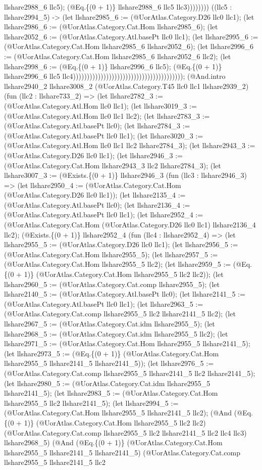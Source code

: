 \documentclass[11pt]{article}
\begin{document}
llshare2988\_6 llc5); (@Eq.\{(0 + 1)\} llshare2988\_6 llc5 llc3)))))))) ((llc5 : llshare2994\_5) -> (let llshare2985\_6 := (@UorAtlas.Category.D26 llc0 llc1); (let llshare2986\_6 := (@UorAtlas.Category.Cat.Hom llshare2985\_6); (let llshare2052\_6 := (@UorAtlas.Category.Atl.basePt llc0 llc1); (let llshare2995\_6 := (@UorAtlas.Category.Cat.Hom llshare2985\_6 llshare2052\_6); (let llshare2996\_6 := (@UorAtlas.Category.Cat.Hom llshare2985\_6 llshare2052\_6 llc2); (let llshare2998\_6 := (@Eq.\{(0 + 1)\} llshare2996\_6 llc5); (@Eq.\{(0 + 1)\} llshare2996\_6 llc5 llc4)))))))))))))))))))))))))))))))))))))))); (@And.intro llshare2940\_2 llshare3008\_2 (@UorAtlas.Category.T45 llc0 llc1 llshare2939\_2) (fun (llc2 : llshare733\_2) => (let llshare2782\_3 := (@UorAtlas.Category.Atl.Hom llc0 llc1); (let llshare3019\_3 := (@UorAtlas.Category.Atl.Hom llc0 llc1 llc2); (let llshare2783\_3 := (@UorAtlas.Category.Atl.basePt llc0); (let llshare2784\_3 := (@UorAtlas.Category.Atl.basePt llc0 llc1); (let llshare3020\_3 := (@UorAtlas.Category.Atl.Hom llc0 llc1 llc2 llshare2784\_3); (let llshare2943\_3 := (@UorAtlas.Category.D26 llc0 llc1); (let llshare2946\_3 := (@UorAtlas.Category.Cat.Hom llshare2943\_3 llc2 llshare2784\_3); (let llshare3007\_3 := (@Exists.\{(0 + 1)\} llshare2946\_3 (fun (llc3 : llshare2946\_3) => (let llshare2950\_4 := (@UorAtlas.Category.Cat.Hom (@UorAtlas.Category.D26 llc0 llc1)); (let llshare2135\_4 := (@UorAtlas.Category.Atl.basePt llc0); (let llshare2136\_4 := (@UorAtlas.Category.Atl.basePt llc0 llc1); (let llshare2952\_4 := (@UorAtlas.Category.Cat.Hom (@UorAtlas.Category.D26 llc0 llc1) llshare2136\_4 llc2); (@Exists.\{(0 + 1)\} llshare2952\_4 (fun (llc4 : llshare2952\_4) => (let llshare2955\_5 := (@UorAtlas.Category.D26 llc0 llc1); (let llshare2956\_5 := (@UorAtlas.Category.Cat.Hom llshare2955\_5); (let llshare2957\_5 := (@UorAtlas.Category.Cat.Hom llshare2955\_5 llc2); (let llshare2959\_5 := (@Eq.\{(0 + 1)\} (@UorAtlas.Category.Cat.Hom llshare2955\_5 llc2 llc2)); (let llshare2960\_5 := (@UorAtlas.Category.Cat.comp llshare2955\_5); (let llshare2140\_5 := (@UorAtlas.Category.Atl.basePt llc0); (let llshare2141\_5 := (@UorAtlas.Category.Atl.basePt llc0 llc1); (let llshare2963\_5 := (@UorAtlas.Category.Cat.comp llshare2955\_5 llc2 llshare2141\_5 llc2); (let llshare2967\_5 := (@UorAtlas.Category.Cat.idm llshare2955\_5); (let llshare2968\_5 := (@UorAtlas.Category.Cat.idm llshare2955\_5 llc2); (let llshare2971\_5 := (@UorAtlas.Category.Cat.Hom llshare2955\_5 llshare2141\_5); (let llshare2973\_5 := (@Eq.\{(0 + 1)\} (@UorAtlas.Category.Cat.Hom llshare2955\_5 llshare2141\_5 llshare2141\_5)); (let llshare2976\_5 := (@UorAtlas.Category.Cat.comp llshare2955\_5 llshare2141\_5 llc2 llshare2141\_5); (let llshare2980\_5 := (@UorAtlas.Category.Cat.idm llshare2955\_5 llshare2141\_5); (let llshare2983\_5 := (@UorAtlas.Category.Cat.Hom llshare2955\_5 llc2 llshare2141\_5); (let llshare2994\_5 := (@UorAtlas.Category.Cat.Hom llshare2955\_5 llshare2141\_5 llc2); (@And (@Eq.\{(0 + 1)\} (@UorAtlas.Category.Cat.Hom llshare2955\_5 llc2 llc2) (@UorAtlas.Category.Cat.comp llshare2955\_5 llc2 llshare2141\_5 llc2 llc4 llc3) llshare2968\_5) (@And (@Eq.\{(0 + 1)\} (@UorAtlas.Category.Cat.Hom llshare2955\_5 llshare2141\_5 llshare2141\_5) (@UorAtlas.Category.Cat.comp llshare2955\_5 llshare2141\_5 llc2 
\end{document}
